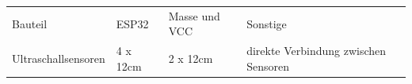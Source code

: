 \documentclass[
]{article}
\begin{document}
\begin{longtable}[]{@{}llll@{}}
\toprule
\endhead
\begin{minipage}[t]{0.22\columnwidth}\raggedright
{Bauteil}\strut
\end{minipage} & \begin{minipage}[t]{0.22\columnwidth}\raggedright
{ESP32}\strut
\end{minipage} & \begin{minipage}[t]{0.22\columnwidth}\raggedright
{Masse und VCC}\strut
\end{minipage} & \begin{minipage}[t]{0.22\columnwidth}\raggedright
{Sonstige}\strut
\end{minipage}\tabularnewline
\begin{minipage}[t]{0.22\columnwidth}\raggedright
{Ultraschallsensoren}\strut
\end{minipage} & \begin{minipage}[t]{0.22\columnwidth}\raggedright
{4 x 12cm}\strut
\end{minipage} & \begin{minipage}[t]{0.22\columnwidth}\raggedright
{2 x 12cm}\strut
\end{minipage} & \begin{minipage}[t]{0.22\columnwidth}\raggedright
{direkte Verbindung zwischen Sensoren}


\end{minipage}
\end{longtable}
\end{document}
